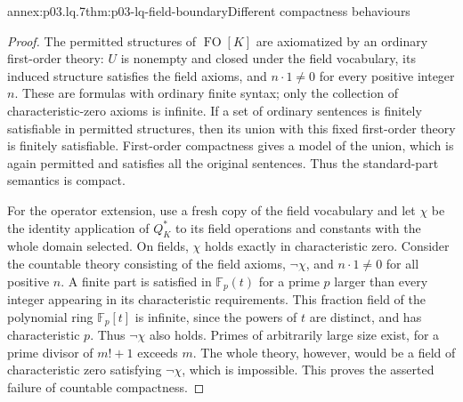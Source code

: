 \begin{annexitem}{annex:p03.lq.7}{thm:p03-lq-field-boundary}{Different compactness behaviours}
\begin{proof}
The permitted structures of \(\operatorname{FO}[K]\) are axiomatized
by an ordinary first-order theory: \(U\) is nonempty and closed
under the field vocabulary, its induced structure satisfies the
field axioms, and \(n\cdot1\ne0\) for every positive integer \(n\).
These are formulas with ordinary finite syntax; only the collection
of characteristic-zero axioms is infinite. If a set of ordinary
sentences is finitely satisfiable in permitted structures, then
its union with this fixed first-order theory is finitely
satisfiable. First-order compactness gives a model of the union,
which is again permitted and satisfies all the original sentences.
Thus the standard-part semantics is compact.

For the operator extension, use a fresh copy of the field
vocabulary and let \(\chi\) be the identity application of
\(Q_K^*\) to its field operations and constants with the whole
domain selected. On fields, \(\chi\) holds exactly in
characteristic zero. Consider the countable theory consisting of
the field axioms, \(\neg\chi\), and \(n\cdot1\ne0\) for
all positive \(n\). A finite part is satisfied in
\(\mathbb F_p(t)\) for a prime \(p\) larger than every integer
appearing in its characteristic requirements. This fraction field of the polynomial ring \(\mathbb F_p[t]\) is
infinite, since the powers of \(t\) are distinct, and has characteristic
\(p\). Thus \(\neg\chi\) also holds.
Primes of arbitrarily large size exist, for a prime divisor of
\(m!+1\) exceeds \(m\). The whole theory, however, would be a
field of characteristic zero satisfying \(\neg\chi\), which is
impossible. This proves the asserted failure of countable compactness.
\end{proof}
\end{annexitem}

